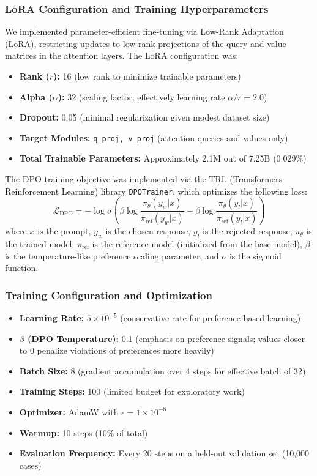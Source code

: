 \documentclass[conference]{IEEEtran}
\begin{document}
\subsubsection{LoRA Configuration and Training Hyperparameters}
We implemented parameter-efficient fine-tuning via Low-Rank Adaptation (LoRA), restricting updates to low-rank projections of the query and value matrices in the attention layers. The LoRA configuration was:
\begin{itemize}
    \item \textbf{Rank ($r$):} 16 (low rank to minimize trainable parameters)
    \item \textbf{Alpha ($\alpha$):} 32 (scaling factor; effectively learning rate $\alpha / r = 2.0$)
    \item \textbf{Dropout:} 0.05 (minimal regularization given modest dataset size)
    \item \textbf{Target Modules:} \texttt{q\_proj, v\_proj} (attention queries and values only)
    \item \textbf{Total Trainable Parameters:} Approximately 2.1M out of 7.25B (0.029\%)
\end{itemize}

The DPO training objective was implemented via the TRL (Transformers Reinforcement Learning) library \texttt{DPOTrainer}, which optimizes the following loss:
$$\mathcal{L}_{\text{DPO}} = -\log \sigma\left(\beta \log \frac{\pi_\theta(y_w | x)}{\pi_{\text{ref}}(y_w | x)} - \beta \log \frac{\pi_\theta(y_l | x)}{\pi_{\text{ref}}(y_l | x)}\right)$$
where $x$ is the prompt, $y_w$ is the chosen response, $y_l$ is the rejected response, $\pi_\theta$ is the trained model, $\pi_{\text{ref}}$ is the reference model (initialized from the base model), $\beta$ is the temperature-like preference scaling parameter, and $\sigma$ is the sigmoid function.

\subsubsection{Training Configuration and Optimization}
\begin{itemize}
    \item \textbf{Learning Rate:} $5 \times 10^{-5}$ (conservative rate for preference-based learning)
    \item \textbf{$\beta$ (DPO Temperature):} 0.1 (emphasis on preference signals; values closer to 0 penalize violations of preferences more heavily)
    \item \textbf{Batch Size:} 8 (gradient accumulation over 4 steps for effective batch of 32)
    \item \textbf{Training Steps:} 100 (limited budget for exploratory work)
    \item \textbf{Optimizer:} AdamW with $\epsilon = 1 \times 10^{-8}$
    \item \textbf{Warmup:} 10 steps (10\% of total)
    \item \textbf{Evaluation Frequency:} Every 20 steps on a held-out validation set (10,000 cases)
\end{itemize}
\end{document}
